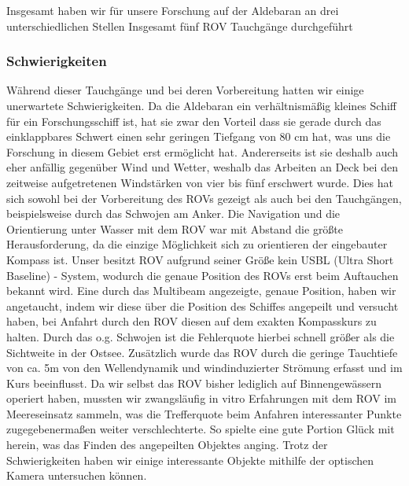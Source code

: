 Insgesamt haben wir für unsere Forschung auf der Aldebaran an drei unterschiedlichen Stellen Insgesamt fünf ROV Tauchgänge durchgeführt 
\subsubsection{Schwierigkeiten}
Während dieser Tauchgänge und bei deren Vorbereitung hatten wir einige unerwartete Schwierigkeiten.
Da die Aldebaran ein verhältnismäßig kleines Schiff für ein Forschungsschiff ist, hat sie zwar den Vorteil dass sie gerade durch das einklappbares Schwert einen sehr geringen Tiefgang von 80 cm hat, was uns die Forschung in diesem Gebiet erst ermöglicht hat.
Andererseits ist sie deshalb auch eher anfällig gegenüber Wind und Wetter, weshalb das Arbeiten an Deck bei den zeitweise aufgetretenen Windstärken von vier bis fünf erschwert wurde.
Dies hat sich sowohl bei der Vorbereitung des ROVs gezeigt als auch bei den Tauchgängen, beispielsweise durch das Schwojen am Anker.
Die Navigation und die Orientierung unter Wasser mit dem ROV war mit Abstand die größte Herausforderung, da die einzige Möglichkeit sich zu orientieren der eingebauter Kompass ist.
Unser besitzt ROV aufgrund seiner Größe kein USBL (Ultra Short Baseline) - System, wodurch die genaue Position des ROVs erst beim Auftauchen bekannt wird.
Eine durch das Multibeam angezeigte, genaue Position, haben wir angetaucht, indem wir diese über die Position des Schiffes angepeilt und versucht haben, bei Anfahrt durch den ROV diesen auf dem exakten Kompasskurs zu halten.
Durch das o.g. Schwojen ist die Fehlerquote hierbei schnell größer als die Sichtweite in der Ostsee. Zusätzlich wurde das ROV 
durch die geringe Tauchtiefe von ca. 5m von den Wellendynamik und windinduzierter Strömung erfasst und im Kurs beeinflusst. 
Da wir selbst das ROV bisher lediglich auf Binnengewässern operiert haben, mussten wir zwangsläufig in vitro Erfahrungen mit dem ROV im Meereseinsatz sammeln, was die Trefferquote beim Anfahren interessanter Punkte zugegebenermaßen weiter verschlechterte. So spielte eine gute Portion Glück mit herein, was das Finden des angepeilten Objektes anging.
Trotz der Schwierigkeiten haben wir einige interessante Objekte mithilfe der optischen Kamera untersuchen können.\\

